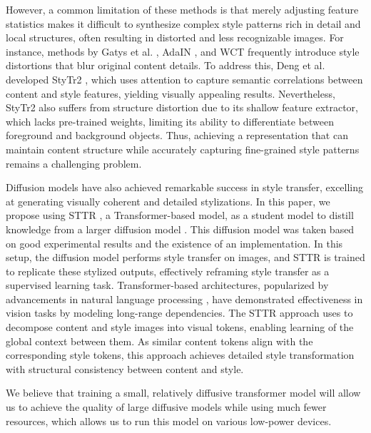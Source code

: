 \documentclass{article}
\begin{document}
    However, a common limitation of these methods is that merely adjusting feature statistics makes it difficult to synthesize complex style patterns rich in detail and local structures, often resulting in distorted and less recognizable images. For instance, methods by Gatys et al. \cite{method 10}, AdaIN \cite{method 14}, and WCT \cite{method 15} frequently introduce style distortions that blur original content details. To address this, Deng et al. developed StyTr2 \cite{method 18}, which uses attention to capture semantic correlations between content and style features, yielding visually appealing results. Nevertheless, StyTr2 also suffers from structure distortion due to its shallow feature extractor, which lacks pre-trained weights, limiting its ability to differentiate between foreground and background objects. Thus, achieving a representation that can maintain content structure while accurately capturing fine-grained style patterns remains a challenging problem.
    
    Diffusion models \cite{method 1, method 2, method 3, method 4} have also achieved remarkable success in style transfer, excelling at generating visually coherent and detailed stylizations. In this paper, we propose using STTR \cite{method 5}, a Transformer-based model, as a student model to distill knowledge from a larger diffusion model \cite{method 4}. This diffusion model was taken based on good experimental results and the existence of an implementation. In this setup, the diffusion model \cite{method 4} performs style transfer on images, and STTR \cite{method 5} is trained to replicate these stylized outputs, effectively reframing style transfer as a supervised learning task. Transformer-based architectures, popularized by advancements in natural language processing \cite{method 19}, have demonstrated effectiveness in vision tasks by modeling long-range dependencies. The STTR \cite{method 5} approach uses to decompose content and style images into visual tokens, enabling learning of the global context between them. As similar content tokens align with the corresponding style tokens, this approach achieves detailed style transformation with structural consistency between content and style.

    We believe that training a small, relatively diffusive transformer model will allow us to achieve the quality of large diffusive models while using much fewer resources, which allows us to run this model on various low-power devices.
\end{document}
